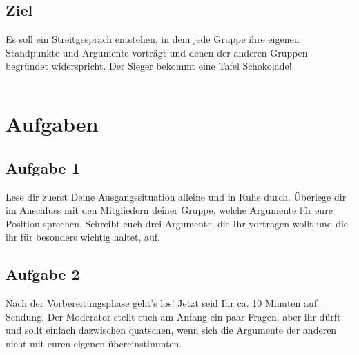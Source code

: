 \documentclass[11pt,a4paper,DIV=10,BCOR=0mm]{scrartcl}
\begin{document}
\subsection*{Ziel}
Es soll ein Streitgespräch entstehen, in dem jede Gruppe ihre eigenen
Standpunkte und Argumente vorträgt und denen der anderen Gruppen
begründet widerspricht. Der Sieger bekommt eine Tafel Schokolade! \\
\hrule
\section*{Aufgaben}
\subsection*{Aufgabe 1}
Lese  dir zuerst Deine Ausgangssituation alleine und in Ruhe durch. Überlege dir im Anschluss mit den Mitgliedern deiner Gruppe, welche Argumente für eure Position sprechen. Schreibt euch drei Argumente, die
Ihr vortragen wollt und die ihr für besonders wichtig haltet, auf. 
\subsection*{Aufgabe 2}
Nach der Vorbereitungsphase geht’s los! Jetzt seid Ihr ca. 10 Minuten auf Sendung. Der Moderator stellt euch am Anfang ein paar Fragen, aber ihr dürft und sollt einfach dazwischen quatschen, wenn sich die Argumente
der anderen nicht mit euren eigenen übereinstimmten.
\end{document}
